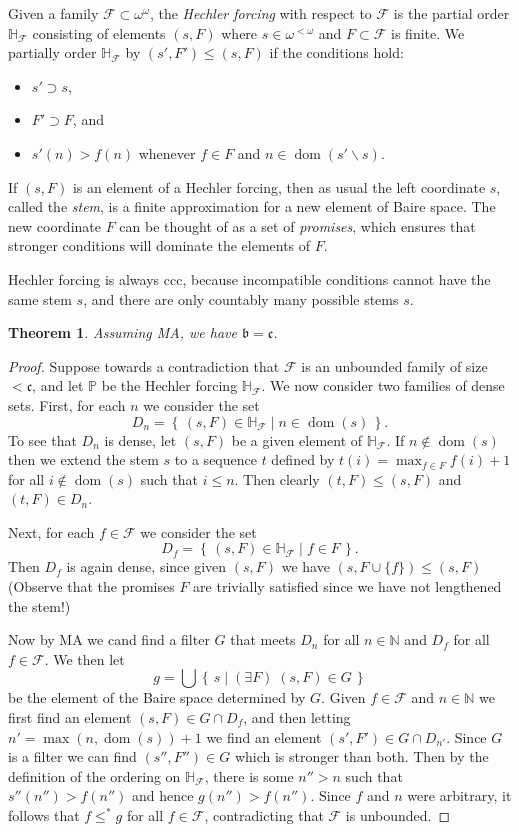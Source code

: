 \documentclass[11pt,oneside]{amsbook}
\newcommand{\set}[1]{\left\{\,#1\,\right\}}
\newcommand{\N}{\mathbb N}
\newcommand{\PP}{\mathbb P}
\DeclareMathOperator{\dom}{dom}
\theoremstyle{definition}
\theoremstyle{plain}
\newtheorem{theorem}{Theorem}[section]
\theoremstyle{definition}
\theoremstyle{remark}
\numberwithin{equation}{section}
\numberwithin{figure}{section}
\begin{document}
Given a family $\mathcal F\subset\omega^\omega$, the \emph{Hechler forcing} with respect to $\mathcal F$ is the partial order $\mathbb H_{\mathcal F}$ consisting of elements $(s,F)$ where $s\in\omega^{<\omega}$ and $F\subset\mathcal F$ is finite. We partially order $\mathbb H_{\mathcal F}$ by $(s',F')\leq(s,F)$ if the conditions hold:
\begin{itemize}
\item $s'\supset s$,
\item $F'\supset F$, and
\item $s'(n)>f(n)$ whenever $f\in F$ and $n\in\dom(s'\smallsetminus s)$.
\end{itemize}
If $(s,F)$ is an element of a Hechler forcing, then as usual the left coordinate $s$, called the \emph{stem}, is a finite approximation for a new element of Baire space. The new coordinate $F$ can be thought of as a set of \emph{promises}, which ensures that stronger conditions will dominate the elements of $F$.

Hechler forcing is always ccc, because incompatible conditions cannot have the same stem $s$, and there are only countably many possible stems $s$.

\begin{theorem}
  Assuming MA, we have $\mathfrak b=\mathfrak c$.
\end{theorem}

\begin{proof}
  Suppose towards a contradiction that $\mathcal F$ is an unbounded family of size $<\mathfrak c$, and let $\PP$ be the Hechler forcing $\mathbb H_{\mathcal F}$. We now consider two families of dense sets. First, for each $n$ we consider the set
  \[D_n=\set{(s,F)\in\mathbb H_{\mathcal F}\mid n\in\dom(s)}\text{.}
  \]
  To see that $D_n$ is dense, let $(s,F)$ be a given element of $\mathbb H_{\mathcal F}$. If $n\notin\dom(s)$ then we extend the stem $s$ to a sequence $t$ defined by $t(i)=\max_{f\in F}f(i)+1$ for all $i\notin\dom(s)$ such that $i\leq n$. Then clearly $(t,F)\leq(s,F)$ and $(t,F)\in D_n$.

  Next, for each $f\in\mathcal F$ we consider the set
  \[D_f=\set{(s,F)\in\mathbb H_{\mathcal F}\mid f\in F}\text{.}
  \]
  Then $D_f$ is again dense, since given $(s,F)$ we have $(s,F\cup\{f\})\leq(s,F)$ (Observe that the promises $F$ are trivially satisfied since we have not lengthened the stem!)

  Now by MA we cand find a filter $G$ that meets $D_n$ for all $n\in\N$ and  $D_f$ for all $f\in\mathcal F$. We then let
  \[g=\bigcup\set{s\mid(\exists F)\;(s,F)\in G}
  \]
  be the element of the Baire space determined by $G$. Given $f\in\mathcal F$ and $n\in\N$ we first find an element $(s,F)\in G\cap D_f$, and then letting $n'=\max(n,\dom(s))+1$ we find an element $(s',F')\in G\cap D_{n'}$. Since $G$ is a filter we can find $(s'',F'')\in G$ which is stronger than both. Then by the definition of the ordering on $\mathbb H_{\mathcal F}$, there is some $n''>n$ such that $s''(n'')>f(n'')$ and hence $g(n'')>f(n'')$. Since $f$ and $n$ were arbitrary, it follows that $f\leq^*g$ for all $f\in\mathcal F$, contradicting that $\mathcal F$ is unbounded.
\end{proof}
\end{document}

